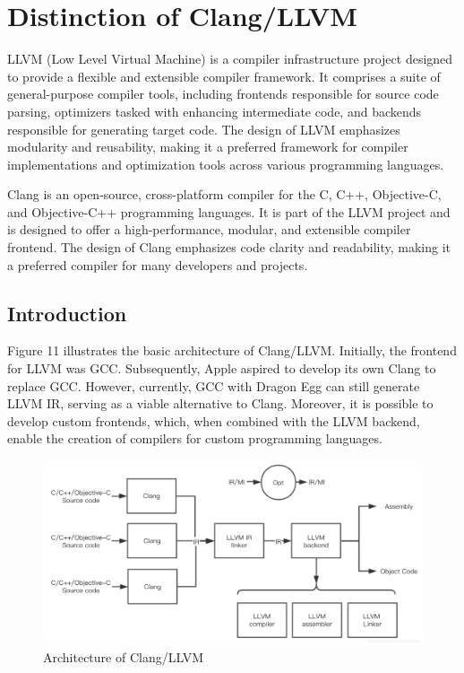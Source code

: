 \documentclass[conference]{IEEEtran}
\begin{document}
\section{Distinction of Clang/LLVM}

LLVM (Low Level Virtual Machine) is a compiler infrastructure project designed to provide a flexible and extensible compiler framework. It comprises a suite of general-purpose compiler tools, including frontends responsible for source code parsing, optimizers tasked with enhancing intermediate code, and backends responsible for generating target code. The design of LLVM emphasizes modularity and reusability, making it a preferred framework for compiler implementations and optimization tools across various programming languages.

Clang is an open-source, cross-platform compiler for the C, C++, Objective-C, and Objective-C++ programming languages. It is part of the LLVM project and is designed to offer a high-performance, modular, and extensible compiler frontend. The design of Clang emphasizes code clarity and readability, making it a preferred compiler for many developers and projects.

\subsection{Introduction}

Figure 11 illustrates the basic architecture of Clang/LLVM. Initially, the frontend for LLVM was GCC. Subsequently, Apple aspired to develop its own Clang to replace GCC. However, currently, GCC with Dragon Egg can still generate LLVM IR, serving as a viable alternative to Clang. Moreover, it is possible to develop custom frontends, which, when combined with the LLVM backend, enable the creation of compilers for custom programming languages.

\begin{figure}[htbp]
\centering
\includegraphics [width=0.95\linewidth]{pictures/ClangLLVMoverview.png}
\caption{Architecture of Clang/LLVM\cite{b8}}
\label{fig11}
\end{figure}
\end{document}
